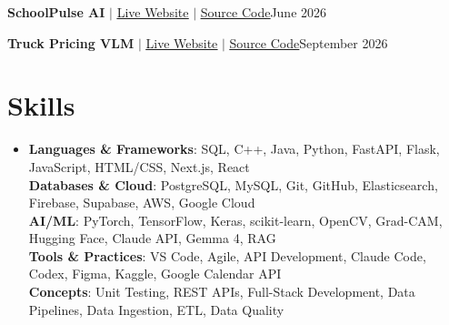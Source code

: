 \documentclass[letterpaper,10pt]{article}
\begin{document}
    \resumeProjectHeading
      {\textbf{SchoolPulse AI} $|$ \href{https://school-pulse-ai.vercel.app/}{\underline{Live Website}} $|$ \href{https://github.com/vignesh-nagarajan-vn/SchoolPulse-AI}{\underline{Source Code}}}{June 2026}
      \resumeItemListStart
      \resumeItemListEnd

    \resumeProjectHeading
      {\textbf{Truck Pricing VLM} $|$ \href{https://truck-pricing-vlm.vercel.app/}{\underline{Live Website}} $|$ \href{https://github.com/Raghavsk24/Truck-Pricing-VLM}{\underline{Source Code}}}{September 2026}
      \resumeItemListStart
      \resumeItemListEnd

  \resumeSubHeadingListEnd


\section{Skills}
 \begin{itemize}[leftmargin=0.15in, label={}]
    \item{
     \textbf{Languages \& Frameworks}{: SQL, C++, Java, Python, FastAPI, Flask, JavaScript, HTML/CSS, Next.js, React} \\
     \textbf{Databases \& Cloud}{: PostgreSQL, MySQL, Git, GitHub, Elasticsearch, Firebase, Supabase, AWS, Google Cloud} \\
     \textbf{AI/ML}{: PyTorch, TensorFlow, Keras, scikit-learn, OpenCV, Grad-CAM, Hugging Face, Claude API, Gemma 4, RAG} \\
     \textbf{Tools \& Practices}{: VS Code, Agile, API Development, Claude Code, Codex, Figma, Kaggle, Google Calendar API} \\
     \textbf{Concepts}{: Unit Testing, REST APIs, Full-Stack Development, Data Pipelines, Data Ingestion, ETL, Data Quality}
    }
 \end{itemize}
 \vspace{3.53pt}

\end{document}

